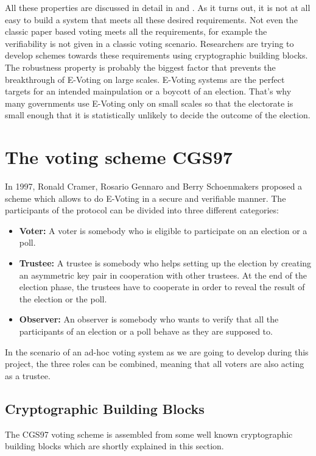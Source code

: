 \documentclass[numbers=noenddot, abstract=on, a4paper, headsepline,
footsepline, oneside, draft=off]{scrreprt}
\begin{document}
All these properties are discussed in detail in \cite{HS11} and \cite{Jonker09}.
As it turns out, it is not at all easy to build a system that meets all these
desired requirements. Not even the classic paper based voting meets all the
requirements, for example the verifiability is not given in a classic voting
scenario. Researchers are trying to develop schemes towards these requirements
using cryptographic building blocks. The robustness property is probably the
biggest factor that prevents the breakthrough of E-Voting on large scales.
E-Voting systems are the perfect targets for an intended mainpulation or a
boycott of an election. That's why many governments use E-Voting only on small
scales so that the electorate is small enough that it is statistically unlikely
to decide the outcome of the election.

\section{The voting scheme CGS97}
\label{sec:CGS97}
In 1997, Ronald Cramer, Rosario Gennaro and Berry Schoenmakers proposed a scheme
\cite{CGS97} which allows to do E-Voting in a secure and verifiable manner. The participants of
the protocol can be divided into three different categories:
\begin{itemize}
  \item \textbf{Voter:} A voter is somebody who is eligible to participate on
  an election or a poll. 
  \item \textbf{Trustee:} A trustee is somebody who helps setting up the
  election by creating an asymmetric key pair in cooperation with other
  trustees.
  At the end of the election phase, the trustees have to cooperate in order to
  reveal the result of the election or the poll.
  \item \textbf{Observer:} An observer is somebody who wants to verify that all
  the participants of an election or a poll behave as they are supposed to.
\end{itemize}

In the scenario of an ad-hoc voting system as we are going to develop during
this project, the three roles can be combined, meaning that all voters are also
acting as a trustee. 

\subsection{Cryptographic Building Blocks}
\label{sec:buildingblocks}
The CGS97 voting scheme is assembled from some well known cryptographic building
blocks which are shortly explained in this section.
\end{document}
